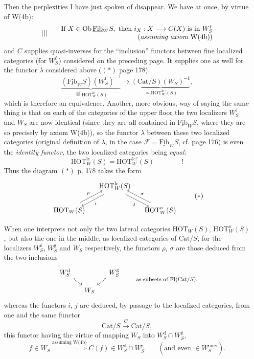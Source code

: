 \documentclass[11pt]{article}
\newcommand{\printedpage}[1]{\marginpar{\footnotesize p.~#1}}
\newcommand{\msp}[1]{\marginpar{\footnotesize [#1]}}
\newcommand{\Fib}{\underline{\mathrm{Fib}}}
\newcommand{\HOT}{\mathrm{HOT}}
\newcommand{\Cat}{\mathrm{Cat}}
\newcommand{\Ob}{\mathrm{Ob}}
\newcommand{\lcs}{\mathrm{lc}\,!}
\begin{document}
\printedpage{112}
Then the perplexities I have just spoken of disappear. We have at once, by virtue of W(4b):
\[
|||\qquad
\begin{array}{@{}r@{}}
\text{If } X \in \Ob\,\Fib_W S, \text{ then } i_X : X \longrightarrow C(X) \text{ is in } W^{\mathrm{f}}_S \\
(\textit{assuming axiom } \text{W(4b)})
\end{array}
\]
and $C$ supplies quasi-inverses for the ``inclusion'' functors between fine localized categories (for $W^{\mathrm{f}}_S$) considered on the preceding page. It supplies one as well for the functor $\lambda$ considered above ($(\ast)$ page 178)
\[
\underbrace{(\Fib_W S)(W^{\mathrm{f}}_S)^{-1}}_{\overset{\text{def}}{=}\HOT^{\mathrm{lc}}_W(S)} \longrightarrow \underbrace{(\Cat/S)(W_S)^{-1}}_{\simeq \HOT^{\lcs}_W(S)},
\]
which is therefore an equivalence. Another, more obvious, way of saying the same thing is that on each of the categories of the upper floor the two localizers $W^{\mathrm{f}}_S$ and $W_S$ are now identical (since they are all contained in $\Fib_W S$, where they are so precisely by axiom W(4b)), so the functor $\lambda$ between these two localized categories (original definition of $\lambda$, in the case $\mathcal{F} = \Fib_W S$, cf. page 176) is even the \textit{identity functor,} the two localized categories being \textit{equal:}
\[
\HOT^{\mathrm{lc}}_W(S) = \HOT^{\lcs}_W(S) \qquad\qquad !
\]
Thus the diagram $(\ast)$ p. 178 takes the form
\[
\begin{tikzcd}[column sep=small]
 & \HOT^{\mathrm{lc}}_W(S) \arrow[dl, shift left=1.2, "i"] \arrow[dr, shift right=1.2, "j"'] & \\
\HOT_W(S) \arrow[ur, shift left=1.2, "\rho"] & & \HOT^{o}_W(S). \arrow[ul, shift right=1.2, "\sigma"']
\end{tikzcd}
\tag*{$(\ast)$}
\]

\noindent\msp{page 182}
When one interprets not only the two lateral categories $\HOT_W(S)$, $\HOT^{o}_W(S)$, but also the one in the middle, as localized categories of $\Cat/S$, for the localizers $W^{\mathrm{d}}_S$, $W^{\mathrm{g}}_S$ and $W_S$ respectively, the functors $\rho$, $\sigma$ are those deduced from the two inclusions
\[
\begin{tikzcd}[column sep=small, row sep=small]
W^{\mathrm{d}}_S \arrow[dr, hook] & & W^{\mathrm{g}}_S \arrow[dl, hook'] \\
 & W_S &
\end{tikzcd}
\qquad \text{\footnotesize as subsets of Fl(Cat/$S$),}
\]
whereas the functors $i$, $j$ are deduced, by passage to the localized categories, from one and the same functor
\[
\Cat/S \xrightarrow{C} \Cat/S,
\]
this functor having the virtue of mapping $W_S$ into $W^{\mathrm{d}}_S \cap W^{\mathrm{g}}_S$,
\[
f \in W_S \overset{\text{assuming W(4b)}}{\Longrightarrow} C(f) \in W^{\mathrm{d}}_S \cap W^{\mathrm{g}}_S \qquad (\text{and even } \in W^{\mathrm{univ}}_S).
\]
\end{document}
